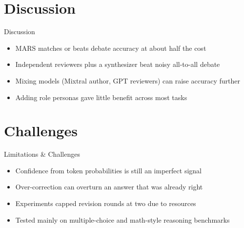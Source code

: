 \documentclass[10pt]{beamer}
\begin{document}
\section{Discussion}
\begin{frame}{Discussion}
\begin{itemize}
  \item MARS matches or beats debate accuracy at about half the cost
  \item Independent reviewers plus a synthesizer beat noisy all-to-all debate
  \item Mixing models (Mixtral author, GPT reviewers) can raise accuracy further
  \item Adding role personas gave little benefit across most tasks
\end{itemize}
\end{frame}
\section{Challenges}
\begin{frame}{Limitations \& Challenges}
\begin{itemize}
  \item Confidence from token probabilities is still an imperfect signal
  \item Over-correction can overturn an answer that was already right
  \item Experiments capped revision rounds at two due to resources
  \item Tested mainly on multiple-choice and math-style reasoning benchmarks
\end{itemize}
\end{frame}
\end{document}
